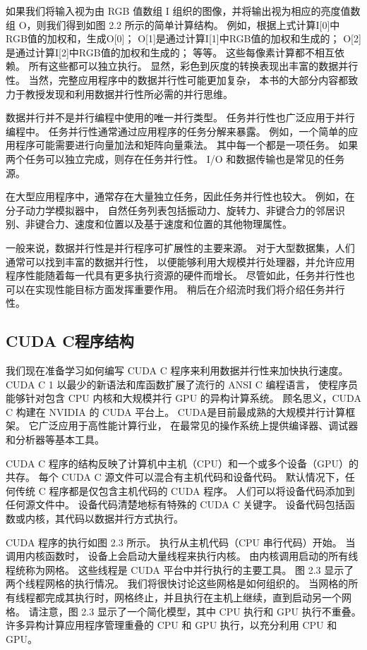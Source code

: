 如果我们将输入视为由 RGB 值数组 I 组织的图像，并将输出视为相应的亮度值数组 O，则我们得到如图 2.2 所示的简单计算结构。 
例如，根据上式计算I[0]中RGB值的加权和，生成O[0]； O[1]是通过计算I[1]中RGB值的加权和生成的； 
O[2]是通过计算I[2]中RGB值的加权和生成的； 等等。 这些每像素计算都不相互依赖。 所有这些都可以独立执行。 
显然，彩色到灰度的转换表现出丰富的数据并行性。 当然，完整应用程序中的数据并行性可能更加复杂，
本书的大部分内容都致力于教授发现和利用数据并行性所必需的并行思维。

\begin{remark}[任务并行与数据并行]
数据并行并不是并行编程中使用的唯一并行类型。 任务并行性也广泛应用于并行编程中。 
任务并行性通常通过应用程序的任务分解来暴露。 例如，一个简单的应用程序可能需要进行向量加法和矩阵向量乘法。 
其中每一个都是一项任务。 如果两个任务可以独立完成，则存在任务并行性。 I/O 和数据传输也是常见的任务源。

在大型应用程序中，通常存在大量独立任务，因此任务并行性也较大。 例如，在分子动力学模拟器中，
自然任务列表包括振动力、旋转力、非键合力的邻居识别、非键合力、速度和位置以及基于速度和位置的其他物理属性。

一般来说，数据并行性是并行程序可扩展性的主要来源。 对于大型数据集，人们通常可以找到丰富的数据并行性，
以便能够利用大规模并行处理器，并允许应用程序性能随着每一代具有更多执行资源的硬件而增长。 
尽管如此，任务并行性也可以在实现性能目标方面发挥重要作用。 稍后在介绍流时我们将介绍任务并行性。
\end{remark}

\subsection{CUDA C程序结构}
我们现在准备学习如何编写 CUDA C 程序来利用数据并行性来加快执行速度。 
CUDA C 1 以最少的新语法和库函数扩展了流行的 ANSI C 编程语言，
使程序员能够针对包含 CPU 内核和大规模并行 GPU 的异构计算系统。 顾名思义，CUDA C 构建在 NVIDIA 的 CUDA 平台上。 
CUDA是目前最成熟的大规模并行计算框架。 它广泛应用于高性能计算行业，
在最常见的操作系统上提供编译器、调试器和分析器等基本工具。

CUDA C 程序的结构反映了计算机中主机（CPU）和一个或多个设备（GPU）的共存。 
每个 CUDA C 源文件可以混合有主机代码和设备代码。 默认情况下，任何传统 C 程序都是仅包含主机代码的 CUDA 程序。 
人们可以将设备代码添加到任何源文件中。 设备代码清楚地标有特殊的 CUDA C 关键字。 
设备代码包括函数或内核，其代码以数据并行方式执行。

CUDA 程序的执行如图 2.3 所示。 执行从主机代码（CPU 串行代码）开始。 当调用内核函数时，
设备上会启动大量线程来执行内核。 由内核调用启动的所有线程统称为网格。 这些线程是 CUDA 平台中并行执行的主要工具。 
图 2.3 显示了两个线程网格的执行情况。 我们将很快讨论这些网格是如何组织的。 
当网格的所有线程都完成其执行时，网格终止，并且执行在主机上继续，直到启动另一个网格。 
请注意，图 2.3 显示了一个简化模型，其中 CPU 执行和 GPU 执行不重叠。 
许多异构计算应用程序管理重叠的 CPU 和 GPU 执行，以充分利用 CPU 和 GPU。

